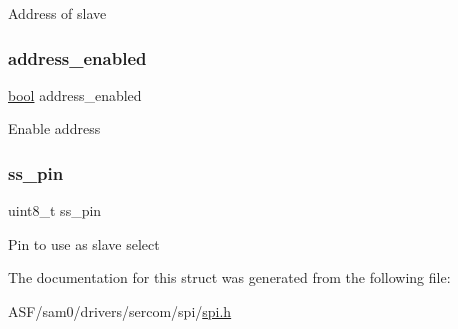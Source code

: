 Address of slave \mbox{\label{structspi__slave__inst__config_adae5ab61ddeae146a96386325f8e038b}} 
\subsubsection{\texorpdfstring{address\_enabled}{address\_enabled}}
{\footnotesize\ttfamily \mbox{\hyperlink{group__group__sam0__utils_ga97a80ca1602ebf2303258971a2c938e2}{bool}} address\+\_\+enabled}

Enable address \mbox{\label{structspi__slave__inst__config_ae5fb738f754cc7a762c6cc179079b1d8}} 
\subsubsection{\texorpdfstring{ss\_pin}{ss\_pin}}
{\footnotesize\ttfamily uint8\+\_\+t ss\+\_\+pin}

Pin to use as slave select 

The documentation for this struct was generated from the following file\+:\begin{DoxyCompactItemize}
\item 
A\+S\+F/sam0/drivers/sercom/spi/\mbox{\hyperlink{spi_8h}{spi.\+h}}\end{DoxyCompactItemize}
